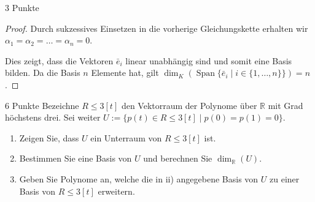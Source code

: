 \documentclass{../problemset}
\begin{document}
\begin{problem}{3 Punkte}
\begin{proof}
	Durch sukzessives Einsetzen in die vorherige Gleichungskette erhalten wir $\alpha_1 = \alpha_2 = \ldots = \alpha_n = 0$.

	Dies zeigt, dass die Vektoren $\bar{e}_i$ linear unabhängig sind und somit eine Basis bilden. Da die Basis $n$ Elemente hat, gilt $\dim_K(\operatorname{Span}\{\bar{e}_i \mid i \in \{1, \ldots, n\}\}) = n$.
\end{proof}
\end{problem}

\begin{problem}{6 Punkte}
Bezeichne $R\leq 3[t]$ den Vektorraum der Polynome über $\mathbb{R}$ mit Grad höchstens drei. Sei weiter $U := \{p(t) \in R\leq 3[t] \mid p(0) = p(1) = 0\}$.
\begin{enumerate}
	\item Zeigen Sie, dass $U$ ein Unterraum von $R\leq 3[t]$ ist.
	\item Bestimmen Sie eine Basis von $U$ und berechnen Sie $\dim_{\mathbb{R}}(U)$.
	\item Geben Sie Polynome an, welche die in ii) angegebene Basis von $U$ zu einer Basis von $R\leq 3[t]$ erweitern.
\end{enumerate}
\end{problem}
\end{document}
